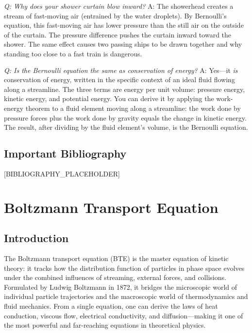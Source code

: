 \documentclass[11pt,openright]{book}
\begin{document}
\textit{Q: Why does your shower curtain blow inward?}
A: The showerhead creates a stream of fast-moving air (entrained by the water droplets). By Bernoulli's equation, this fast-moving air has lower pressure than the still air on the outside of the curtain. The pressure difference pushes the curtain inward toward the shower. The same effect causes two passing ships to be drawn together and why standing too close to a fast train is dangerous.

\textit{Q: Is the Bernoulli equation the same as conservation of energy?}
A: Yes---it \emph{is} conservation of energy, written in the specific context of an ideal fluid flowing along a streamline. The three terms are energy per unit volume: pressure energy, kinetic energy, and potential energy. You can derive it by applying the work-energy theorem to a fluid element moving along a streamline: the work done by pressure forces plus the work done by gravity equals the change in kinetic energy. The result, after dividing by the fluid element's volume, is the Bernoulli equation.
\section*{Important Bibliography}

[BIBLIOGRAPHY_PLACEHOLDER]


\chapter{Boltzmann Transport Equation}

\section*{Introduction}

The Boltzmann transport equation (BTE) is the master equation of kinetic theory: it tracks how the distribution function of particles in phase space evolves under the combined influences of streaming, external forces, and collisions. Formulated by Ludwig Boltzmann in 1872, it bridges the microscopic world of individual particle trajectories and the macroscopic world of thermodynamics and fluid mechanics. From a single equation, one can derive the laws of heat conduction, viscous flow, electrical conductivity, and diffusion---making it one of the most powerful and far-reaching equations in theoretical physics.
\end{document}
